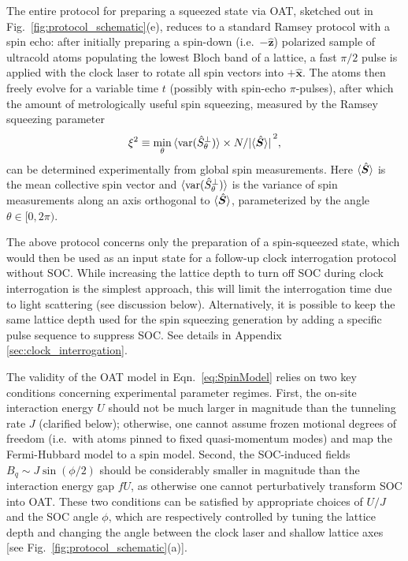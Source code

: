\documentclass[aps,prx,superscriptaddress,notitlepage,twocolumn,longbibliography]{revtex4-1}
\renewcommand{\t}{\text} %
\renewcommand{\v}{\bm} %
\newcommand{\uv}[1]{\hat{\bm #1}} %
\begin{document}
The entire protocol for preparing a squeezed state via OAT, sketched out in Fig.~\ref{fig:protocol_schematic}(e), reduces to a standard Ramsey protocol with a spin echo: after initially preparing a spin-down (i.e.~$-\uv z$) polarized sample of ultracold atoms populating the lowest Bloch band of a lattice, a fast $\pi/2$ pulse is applied with the clock laser to rotate all spin vectors into $+\uv x$.
The atoms then freely evolve for a variable time $t$ (possibly with spin-echo $\pi$-pulses), after which the amount of metrologically useful spin squeezing, measured by the Ramsey squeezing parameter
\begin{align}
  \xi^2 \equiv
  \min_\theta \braket{\t{var}(\hat S^\perp_\theta)}
  \times N/\abs*{\braket{\hat{\v S}}}^2,
\end{align}
can be determined experimentally from global spin measurements.
Here $\braket{\hat{\v S}}$ is the mean collective spin vector and $\braket{\t{var}(\hat S^\perp_\theta)}$ is the variance of spin measurements along an axis orthogonal to $\braket{\hat{\v S}}$, parameterized by the angle $\theta\in[0,2\pi)$.

The above protocol concerns only the preparation of a spin-squeezed state, which would then be used as an input state for a follow-up clock interrogation protocol without SOC.
While increasing the lattice depth to turn off SOC during clock interrogation is the simplest approach, this will limit the interrogation time due to light scattering (see discussion below).
Alternatively, it is possible to keep the same lattice depth used for the spin squeezing generation by adding a specific pulse sequence to suppress SOC.
See details in Appendix \ref{sec:clock_interrogation}.

The validity of the OAT model in Eqn.~\eqref{eq:SpinModel} relies on two key conditions concerning experimental parameter regimes.
First, the on-site interaction energy $U$ should not be much larger in magnitude than the tunneling rate $J$ (clarified below); otherwise, one cannot assume frozen motional degrees of freedom (i.e.~with atoms pinned to fixed quasi-momentum modes) and map the Fermi-Hubbard model to a spin model.
Second, the SOC-induced fields $B_q\sim J\sin(\phi/2)$ should be considerably smaller in magnitude than the interaction energy gap $fU$, as otherwise one cannot perturbatively transform SOC into OAT.
These two conditions can be satisfied by appropriate choices of $U/J$ and the SOC angle $\phi$, which are respectively controlled by tuning the lattice depth and changing the angle between the clock laser and shallow lattice axes [see Fig.~\ref{fig:protocol_schematic}(a)].
\end{document}
